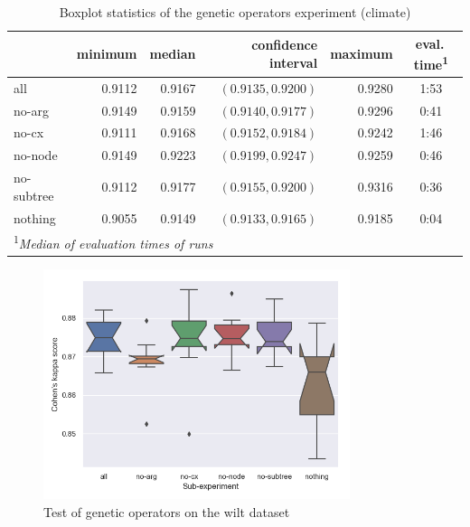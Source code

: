 \begin{table}[ht]
\centering
\caption{Boxplot statistics of the genetic operators experiment (climate)}\label{tab04:exp2:cboxstats}
\begin{tabular}{lrrrr|c}
\toprule
{} &  minimum & median &  confidence interval &  maximum  & eval.\,time\textsuperscript{1} \\
\midrule
all        &   0.9112 &  0.9167 &   $(0.9135, 0.9200)$ &   0.9280 & 1:53 \\
no-arg     &   0.9149 &  0.9159 &   $(0.9140, 0.9177)$ &   0.9296 & 0:41 \\
no-cx      &   0.9111 &  0.9168 &   $(0.9152, 0.9184)$ &   0.9242 & 1:46 \\
no-node    &   0.9149 &  0.9223 &   $(0.9199, 0.9247)$ &   0.9259 & 0:46 \\
no-subtree &   0.9112 &  0.9177 &   $(0.9155, 0.9200)$ &   0.9316 & 0:36 \\
nothing    &   0.9055 &  0.9149 &   $(0.9133, 0.9165)$ &   0.9185 & 0:04 \\
\bottomrule

\multicolumn{6}{l}{\footnotesize\textsuperscript{1}\itshape Median of evaluation times of runs}

\end{tabular}

\end{table}

\begin{figure}[pt]\centering
\includegraphics[width=0.8\textwidth]{../img/wilt-mut-redo.png}
\caption{Test of genetic operators on the wilt dataset}
\label{pic04:mut-wilt}
\end{figure}

